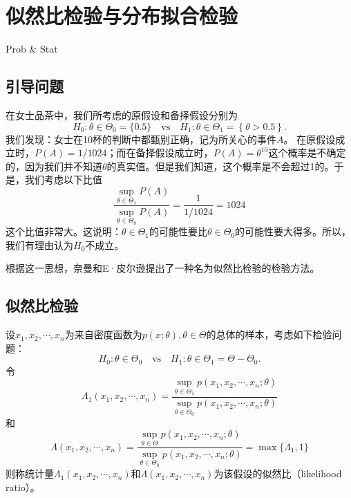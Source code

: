 \chapter{似然比检验与分布拟合检验}
\begin{introduction}
  \item Prob \& Stat
\end{introduction}

\section{引导问题}

\begin{instance}[（回顾：女士品茶）]
在女士品茶中，我们所考虑的原假设和备择假设分别为
$$
H_0: \theta \in \Theta_0 = \{0.5\} \quad \text{vs} \quad H_1: \theta \in \Theta_1 = \left\{ \theta > 0.5\right\}.
$$
我们发现：女士在10杯的判断中都甄别正确，记为所关心的事件$A$。
在原假设成立时，$P(A) = 1/1024$；而在备择假设成立时，$P(A) = \theta^{10}$这个概率是不确定的，因为我们并不知道$\theta$的真实值。但是我们知道，这个概率是不会超过1的。于是，我们考虑以下比值
$$
\frac{\sup_{\theta\in \Theta_1} P(A)}{\sup_{\theta\in \Theta_0} P(A)} = \frac{1}{1/1024} = 1024
$$
这个比值非常大。这说明：$\theta \in \Theta_1$的可能性要比$\theta \in \Theta_0$的可能性要大得多。所以，我们有理由认为$H_0$不成立。
\end{instance}
根据这一思想，奈曼和E·皮尔逊提出了一种名为似然比检验的检验方法。

\section{似然比检验}

\begin{definition}[似然比]
    设$x_1,x_2,\cdots,x_n$为来自密度函数为$p(x;\theta),\theta\in \Theta$的总体的样本，考虑如下检验问题：
    $$
    H_0: \theta \in \Theta_0  \quad \text{vs} \quad H_1: \theta \in \Theta_1 = \Theta- \Theta_0.
    $$
    令
    $$
    \Lambda_1(x_1,x_2,\cdots,x_n) = \frac{\sup_{\theta \in \Theta_1} p(x_1,x_2,\cdots,x_n;\theta)}{\sup_{\theta \in \Theta_0} p(x_1,x_2,\cdots,x_n;\theta)}
    $$
    和
    $$
    \Lambda(x_1,x_2,\cdots,x_n) = \frac{\sup_{\theta \in \Theta} p(x_1,x_2,\cdots,x_n;\theta)}{\sup_{\theta \in \Theta_0} p(x_1,x_2,\cdots,x_n;\theta)}
    =\max\{\Lambda_1,1\}$$
    则称统计量$\Lambda_1(x_1,x_2,\cdots,x_n)$和$\Lambda(x_1,x_2,\cdots,x_n)$为该假设的似然比（likelihood ratio）。
\end{definition}


